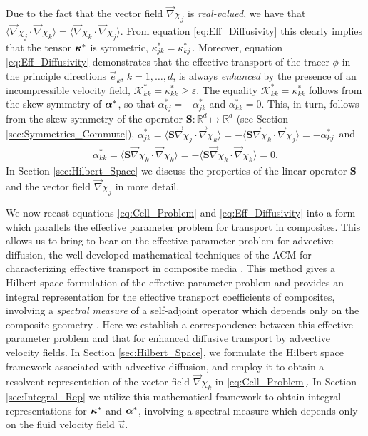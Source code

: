 \documentclass[11pt]{amsart}
\newcommand{\Sb}{\mathbf{S}}
\newcommand{\Kc}{\mathcal{K}}
\newcommand\balpha{\mbox{\boldmath${\alpha}$}}
\newcommand\bkappa{\mbox{\boldmath${\kappa}$}}
\begin{document}
Due to the fact that the vector field
$\vec{\nabla}\chi_j$ is \emph{real-valued}, we have that
$\langle\vec{\nabla}\chi_j\cdot\vec{\nabla}\chi_k\rangle=\langle\vec{\nabla}\chi_k\cdot\vec{\nabla}\chi_j\rangle$. From equation
\eqref{eq:Eff_Diffusivity} this clearly implies that the tensor    
$\bkappa^*$ is symmetric, $\kappa^*_{jk}=\kappa^*_{kj}\,$. Moreover, equation
\eqref{eq:Eff_Diffusivity} demonstrates that the effective transport
of the tracer $\phi$ in the principle directions $\vec{e}_k$, $k=1,\ldots,d$,
is always \emph{enhanced} by the presence of an incompressible velocity
field, $\Kc^*_{kk}=\kappa^*_{kk}\geq\varepsilon$. The equality $\Kc^*_{kk}=\kappa^*_{kk}$
follows from the skew-symmetry of $\balpha^*$, so that
$\alpha^*_{kj}=-\alpha^*_{jk}$ and $\alpha^*_{kk}=0$. This, in turn, follows from the
skew-symmetry of the operator $\Sb:\mathbb{R}^d\mapsto\mathbb{R}^d$ (see Section
\ref{sec:Symmetries_Commute}),
$\alpha^*_{jk}=\langle\Sb\vec{\nabla}\chi_j\cdot\vec{\nabla}\chi_k\rangle=-\langle\Sb\vec{\nabla}\chi_k\cdot\vec{\nabla}\chi_j\rangle=-\alpha^*_{kj}\,$
and 
%
\begin{align}\label{eq:Sb_Skew}
  \alpha^*_{kk}=\langle\Sb\vec{\nabla}\chi_k\cdot\vec{\nabla}\chi_k\rangle=-\langle\Sb\vec{\nabla}\chi_k\cdot\vec{\nabla}\chi_k\rangle=0.  
\end{align}
%
In Section \ref{sec:Hilbert_Space} we discuss the properties of the
linear operator $\Sb$ and the vector field $\vec{\nabla}\chi_j$ in more detail.





We now recast equations \eqref{eq:Cell_Problem} and
\eqref{eq:Eff_Diffusivity} into a form which parallels the effective
parameter problem for transport in composites. This allows us to
bring to bear on the effective parameter problem for advective
diffusion, the well developed mathematical techniques of the
ACM for characterizing effective transport in composite media
\cite{Golden:CMP-473,MILTON:2002:TC}. This method gives a Hilbert
space formulation of the effective parameter problem and provides an
integral representation for the effective transport coefficients of
composites, involving a \emph{spectral measure} of a self-adjoint
operator which depends only on the composite geometry
\cite{Golden:CMP-473,Murphy:JMP:063506,MILTON:2002:TC}. Here we
establish a correspondence between this effective parameter problem
and that for enhanced diffusive transport by advective velocity 
fields. In Section \ref{sec:Hilbert_Space}, we formulate the Hilbert
space framework associated with advective diffusion, and employ it to
obtain a resolvent representation of the vector field $\vec{\nabla}\chi_k$ in
\eqref{eq:Cell_Problem}. In Section \ref{sec:Integral_Rep} we utilize
this mathematical framework to obtain integral representations for 
$\bkappa^*$ and $\balpha^*$, involving a spectral measure which depends
only on the fluid velocity field $\vec{u}$.    
\end{document}
